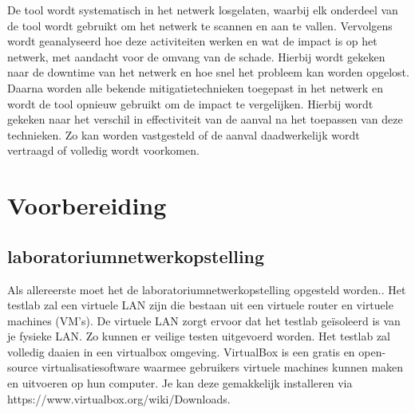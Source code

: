 De tool wordt systematisch in het netwerk losgelaten, waarbij elk onderdeel van de tool wordt gebruikt om het netwerk te scannen en aan te vallen. Vervolgens wordt geanalyseerd hoe deze activiteiten werken en wat de impact is op het netwerk, met aandacht voor de omvang van de schade. Hierbij wordt gekeken naar de downtime van het netwerk en hoe snel het probleem kan worden opgelost.
Daarna worden alle bekende mitigatietechnieken toegepast in het netwerk en wordt de tool opnieuw gebruikt om de impact te vergelijken. Hierbij wordt gekeken naar het verschil in effectiviteit van de aanval na het toepassen van deze technieken. Zo kan worden vastgesteld of de aanval daadwerkelijk wordt vertraagd of volledig wordt voorkomen.

\section{Voorbereiding}
\subsection{laboratoriumnetwerkopstelling}
Als allereerste moet het de laboratoriumnetwerkopstelling opgesteld worden.. Het testlab zal een virtuele LAN zijn die  bestaan uit een virtuele router en virtuele machines (VM’s). De virtuele LAN zorgt ervoor dat het testlab geïsoleerd is van je fysieke LAN. Zo kunnen er veilige testen uitgevoerd worden. Het testlab zal volledig daaien in een virtualbox omgeving. VirtualBox is een gratis en open-source virtualisatiesoftware waarmee gebruikers virtuele machines kunnen maken en uitvoeren op hun computer. Je kan deze gemakkelijk installeren via \newline https://www.virtualbox.org/wiki/Downloads. 

